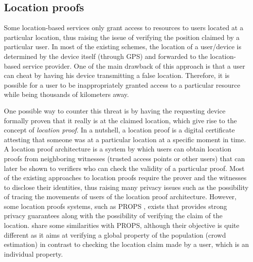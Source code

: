 \subsection{Location proofs}

Some location-based services only grant access to resources to users located at a particular location, thus raising the issue of verifying the position claimed by a particular user. 
In most of the existing schemes, the location of a user/device is determined by the device itself (\eg through GPS) and forwarded to the location-based service provider. 
One of the main drawback of this approach is that a user can cheat by having his device transmitting a false location. 
Therefore, it is possible for a user to be inappropriately granted access to a particular resource while being thousands of kilometers away.

One possible way to counter this threat is by having the requesting device formally proven that it really is at the claimed location, which give rise to the concept of \emph{location proof}. 
In a nutshell, a location proof is a digital certificate attesting that someone was at a particular location at a specific moment in time. A location proof architecture is a system by which users can obtain location proofs from neighboring witnesses (\eg trusted access points or other users) that can later be shown to verifiers who can check the validity of a particular proof.
Most of the existing approaches to location proofs require the prover and the witnesses to disclose their identities, thus raising many privacy issues such as the possibility of tracing the movements of users of the location proof architecture.
However, some location proofs systems, such as PROPS \cite{DBLP:conf/srds/GambsKRT14}, exists that provides strong privacy guarantees along with the possibility of verifying the claim of the location. 
\PRIVO share some similarities with PROPS, although their objective is quite different as it aims at verifying a global property of the population (\ie crowd estimation) in contrast to checking the location claim made by a user, which is an individual property.